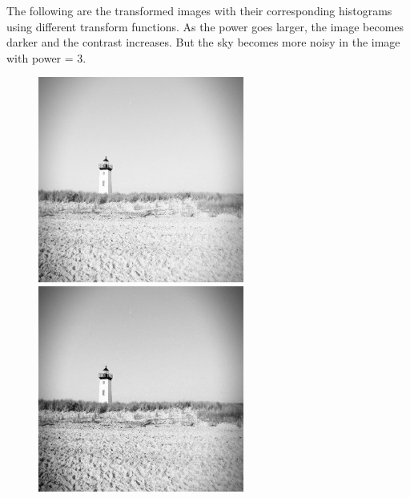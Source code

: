 \documentclass[12pt,a4paper,notitlepage,oneside,amsmath,amssymb]{article}
\begin{document}
\begin{CJK*}{UTF8}{bkai}
\begin{enumerate}[label=(\alph*)]
          The following are the transformed images with their corresponding histograms using different transform functions. As the power goes larger, the image becomes darker and the contrast increases. But the sky becomes more noisy in the image with power = 3.
          \begin{figure}[hbt!]
            \begin{minipage}{.25\textwidth}
              \centering
              \includegraphics[width=.95\linewidth]{imageB}
            \end{minipage}%
            \begin{minipage}{.25\textwidth}
              \centering
              \includegraphics[width=.95\linewidth]{imageC-1_5}

\end{minipage}
\end{figure}
\end{enumerate}
\end{CJK*}
\end{document}
